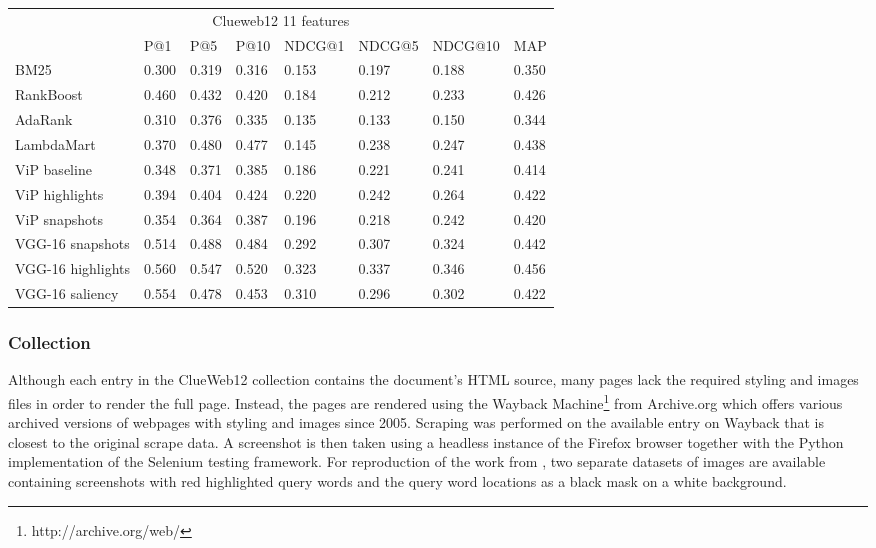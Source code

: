 \begin{table}[t]
\begin{center}
\begin{tabular}{llllllll}
\multicolumn{8}{c}{Clueweb12 11 features}                                    \\ 
                      & P@1   & P@5   & P@10  & NDCG@1 & NDCG@5 & NDCG@10 & MAP   \\ \hline
BM25                  & 0.300 & 0.319 & 0.316 & 0.153  & 0.197  & 0.188   & 0.350 \\ \hline
RankBoost             & 0.460 & 0.432 & 0.420 & 0.184  & 0.212  & 0.233   & 0.426 \\
AdaRank               & 0.310 & 0.376 & 0.335 & 0.135  & 0.133  & 0.150   & 0.344 \\
LambdaMart            & 0.370 & 0.480 & 0.477 & 0.145  & 0.238  & 0.247   & 0.438 \\ \hline
ViP baseline          & 0.348 & 0.371 & 0.385 & 0.186  & 0.221  & 0.241   & 0.414 \\ \hline
ViP highlights        & 0.394 & 0.404 & 0.424 & 0.220  & 0.242  & 0.264   & 0.422 \\
ViP snapshots         & 0.354 & 0.364 & 0.387 & 0.196  & 0.218  & 0.242   & 0.420 \\ \hline
VGG-16 snapshots      & 0.514 & 0.488 & 0.484 & 0.292  & 0.307  & 0.324   & 0.442 \\ 
VGG-16 highlights     & 0.560 & 0.547 & 0.520 & 0.323  & 0.337  & 0.346   & 0.456 \\ \hline
VGG-16 saliency       & 0.554 & 0.478 & 0.453 & 0.310  & 0.296  & 0.302   & 0.422 \\
\end{tabular}
\centering
{}
\label{tab:results}
\end{center}
\end{table}


\subsubsection{Collection}
Although each entry in the ClueWeb12 collection contains the document's HTML source, many pages lack the required styling and images files in order to render the full page. Instead, the pages are rendered using the Wayback Machine\footnote{http://archive.org/web/} from Archive.org which offers various archived versions of webpages with styling and images since 2005. Scraping was performed on the available entry on Wayback that is closest to the original scrape data. A screenshot is then taken using a headless instance of the Firefox browser together with the Python implementation of the Selenium testing framework. 
For reproduction of the work from \citet{fan2017learning}, two separate datasets of images are available containing screenshots with red highlighted query words and the query word locations as a black mask on a white background. 

